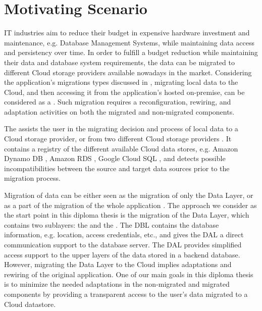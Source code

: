 \section{Motivating Scenario}
\label{sec:motivatingscenario}

IT industries aim to reduce their budget in expensive hardware investment and maintenance, e.g. Database Management Systems, while maintaining data access and persistency over time. In order to fulfill a budget reduction while maintaining their data and database system requirements, the data can be migrated to different Cloud storage providers available nowadays in the market. Considering the application's migrations types discussed in \cite{andrikopoulos2013}, migrating local data to the Cloud, and then accessing it from the application's hosted on-premise, can be considered as a . Such migration requires a reconfiguration, rewiring, and adaptation activities on both the migrated and non-migrated components.

The  assists the user in the migrating decision and process of local data to a Cloud storage provider, or from two different Cloud storage providers \cite{bachmann2012}. It contains a registry of the different available Cloud data stores, e.g. Amazon Dynamo DB  \cite{amazondynamodb}, Amazon RDS \cite{amazonrds}, Google Cloud SQL \cite{googlecloudsql}, and detects possible incompatibilities between the source and target data sources prior to the migration process.

Migration of data can be either seen as the migration of only the Data Layer, or as a part of the migration of the whole application \cite{andrikopoulos2013}. The approach we consider as the start point in this diploma thesis is the migration of the Data Layer, which contains two sublayers: the  and the . The DBL contains the database information, e.g. location, access credentials, etc., and gives the DAL a direct communication support to the database server. The DAL provides simplified access support to the upper layers of the data stored in a backend database. However, migrating the Data Layer to the Cloud implies adaptations and rewiring of the original application. One of our main goals in this diploma thesis is to minimize the needed adaptations in the non-migrated and migrated components by providing a transparent access to the user's data migrated to a Cloud datastore. 

